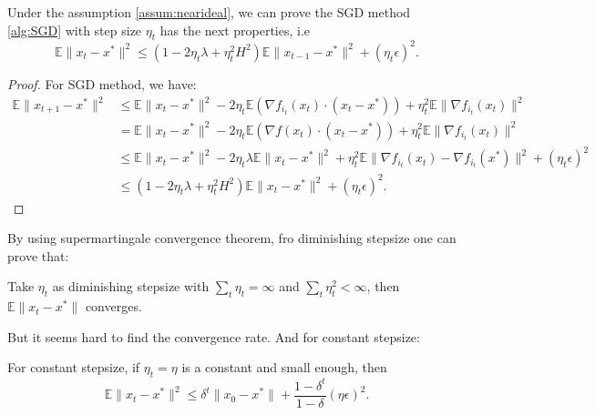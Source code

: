 \begin{theorem}
	Under the assumption \ref{assum:nearideal}, we can prove the SGD method \ref{alg:SGD} with step size $\eta_t$ has the next properties, i.e 
	\begin{equation}
	\mathbb{E}\|x_t - x^*\|^2 \le (1- 2\eta_t \lambda + \eta_t^2 H^2) \mathbb{E} \|x_{t-1} - x^*\|^2 + (\eta_t \epsilon)^2.
	\end{equation}
\end{theorem}
\begin{proof}
	For SGD method, we have:
	\begin{align}
	\mathbb{E} \|x_{t+1} - x^*\|^2 &\le \mathbb{E} \|x_t - x^*\|^2  - 2 \eta_t \mathbb{E} (\nabla f_{i_t}(x_t) \cdot (x_t - x^*)) + \eta_t^2 \mathbb{E} \|\nabla f_{i_t}(x_t)\|^2\\ 
	&= \mathbb{E} \|x_t - x^*\|^2  - 2 \eta_t \mathbb{E} (\nabla f(x_t) \cdot (x_t - x^*))  + \eta_t^2 \mathbb{E} \|\nabla f_{i_t}(x_t)\|^2 \\
	&\le \mathbb{E} \|x_t - x^*\|^2 - 2\eta_t \lambda \mathbb{E}\|x_t - x^*\|^2 + \eta_t^2 \mathbb{E}\|\nabla f_{i_t}(x_t) - \nabla f_{i_t}(x^*)\|^2 +  (\eta_t \epsilon)^2\\
	&\le (1- 2\eta_t \lambda + \eta_t^2 H^2) \mathbb{E}\|x_t - x^*\|^2 + (\eta_t \epsilon)^2.
	\end{align}
\end{proof}

By using supermartingale convergence theorem, fro diminishing stepsize one can prove that:
\begin{theorem}
	Take $\eta_t$ as diminishing stepsize with $\sum_t \eta_t = \infty$ and $\sum_t \eta^2_t < \infty$, then
	$\mathbb{E}\|x_t - x^*\|$ converges. 
\end{theorem}
But it seems hard to find the convergence rate.  And for constant stepsize:
\begin{theorem}
	For constant stepsize, if $\eta_t = \eta$ is a constant and small enough, then 
	\begin{equation}
	\mathbb{E} \|x_{t} - x^*\|^2 \le \delta^t \|x_0 - x^*\| + \frac{1 - \delta^t}{1- \delta}(\eta\epsilon)^2.
	\end{equation}
\end{theorem}

